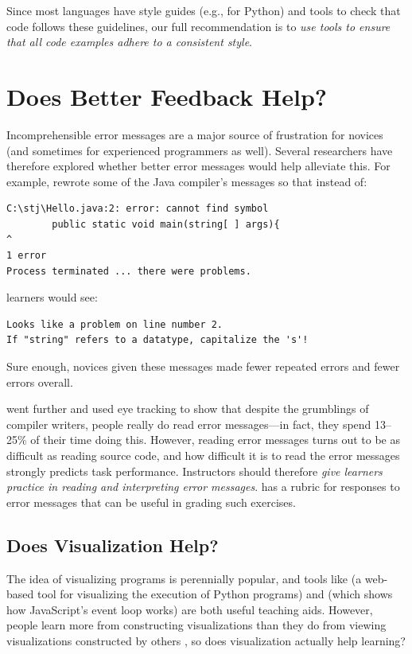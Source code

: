 Since most languages have style guides (e.g.,  for
Python) and tools to check that code follows these guidelines, our
full recommendation is to \emph{use tools to ensure that all code examples
adhere to a consistent style}.

\section{Does Better Feedback Help?}\label{s:pck-error}

Incomprehensible error messages are a major source of frustration for
novices (and sometimes for experienced programmers as well). Several
researchers have therefore explored whether better error messages would
help alleviate this. For example, \cite{Beck2016} rewrote some of the
Java compiler's messages so that instead of:

\begin{verbatim}
C:\stj\Hello.java:2: error: cannot find symbol
        public static void main(string[ ] args){
^
1 error
Process terminated ... there were problems.
\end{verbatim}

learners would see:

\begin{verbatim}
Looks like a problem on line number 2.
If "string" refers to a datatype, capitalize the 's'!
\end{verbatim}

Sure enough, novices given these messages made fewer repeated errors and
fewer errors overall.

\cite{Bari2017} went further and used eye tracking to show that
despite the grumblings of compiler writers, people really do read error
messages---in fact, they spend 13--25\% of their time doing this. However,
reading error messages turns out to be as difficult as reading source
code, and how difficult it is to read the error messages strongly
predicts task performance. Instructors should therefore \emph{give learners
practice in reading and interpreting error messages}. \cite{Marc2011}
has a rubric for responses to error messages that can be useful in
grading such exercises.

\subsection*{Does Visualization Help?}

The idea of visualizing programs is perennially popular, and tools
like \cite{Guo2013} (a web-based tool for visualizing the
execution of Python programs) and  (which shows how
JavaScript's event loop works) are both useful teaching aids.
However, people learn more from constructing visualizations than they
do from viewing visualizations constructed by others
\cite{Stas1998,Ceti2016}, so does visualization actually
help learning?

